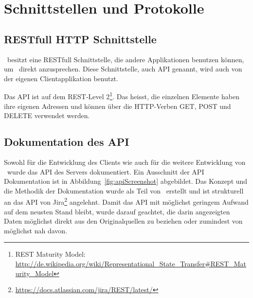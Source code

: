 \chapter{Schnittstellen und Protokolle}
	
\section{RESTfull HTTP Schnittstelle}

	\eeppi\ besitzt eine RESTfull Schnittstelle, die andere Applikationen benutzen können, um \eeppi\ direkt anzusprechen.
	Diese Schnittstelle, auch API genannt, wird auch von der eigenen Clientapplikation benutzt.

	Das API ist auf dem REST-Level 2\footnote{REST Maturity Model: \url{http://de.wikipedia.org/wiki/Representational\_State\_Transfer\#REST\_Maturity\_Model}}.
	Das heisst, die einzelnen Elemente haben ihre eigenen Adressen
	und können über die HTTP-Verben GET, POST und DELETE verwendet werden.
	
\section{Dokumentation des API}
	Sowohl für die Entwicklung des Clients wie auch für die weitere Entwicklung von \eeppi\ wurde das API des Servers dokumentiert.
	Ein Ausschnitt der API Dokumentation ist in Abbildung\ \ref{fig:apiScreenshot} abgebildet.
	Das Konzept und die Methodik der Dokumentation wurde als Teil von \eeppi\ erstellt
	und ist strukturell an das API von Jira\footnote{\url{https://docs.atlassian.com/jira/REST/latest/}} angelehnt.
	Damit das API mit möglichst geringem Aufwand auf dem neusten Stand bleibt, wurde darauf geachtet,
	die darin angezeigten Daten möglichst direkt aus den Originalquellen zu beziehen oder zumindest von möglichst nah davon.
	
